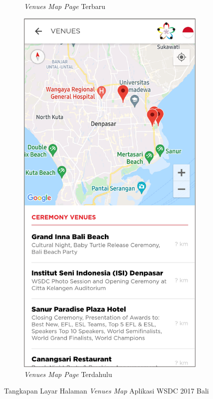 \begin{figure}[H]
\begin{subfigure}[b]{0.3\textwidth}
         \caption{\textit{Venues Map Page} Terbaru}
         \label{fig:ssVenueMap}
     \end{subfigure}
     \hspace*{0.5in}
     \begin{subfigure}[b]{0.3\textwidth}
         \centering
         \includegraphics[width=\textwidth]{Gambar/VenuesMapPage.png}
         \caption{\textit{Venues Map Page} Terdahulu}
         \label{fig:ssVenueMapOld}
     \end{subfigure}
        \caption{Tangkapan Layar Halaman \textit{Venues Map} Aplikasi WSDC 2017 Bali}
        \label{fig:ssApk1}
\end{figure}


